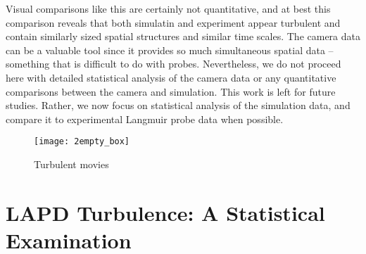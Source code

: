 Visual comparisons like this are certainly not quantitative, and at best this comparison
reveals that both simulatin and experiment appear turbulent and contain similarly sized spatial structures and similar time scales. The camera data can be a valuable tool since it provides
so much simultaneous spatial data -- something that is difficult to do with probes. Nevertheless, we do not proceed here with detailed statistical analysis of the camera data or any
quantitative comparisons between the camera and simulation. This work is left for future studies. Rather, we now focus on statistical analysis of the simulation data, and compare it to
experimental Langmuir probe data when possible.


\begin{figure}[!ht]
\centerline{\texttt{[image: 2empty\_box]}}
\caption{Turbulent movies}
\label{sim_v_exp_anim}
\end{figure}


\section{LAPD Turbulence: A Statistical Examination}
\label{s_stat_exam}


